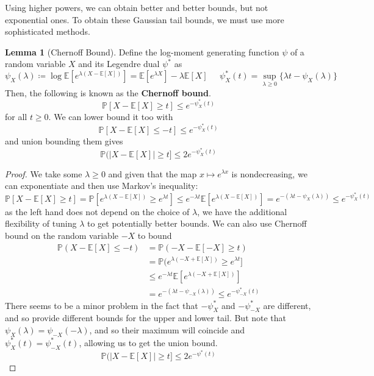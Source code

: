\documentclass{article}
\theoremstyle{definition}
\newtheorem{lemma}[theorem]{Lemma}
\theoremstyle{remark}
\theoremstyle{definition}
\begin{document}
  Using higher powers, we can obtain better and better bounds, but not exponential ones. To obtain these Gaussian tail bounds, we must use more sophisticated methods. 

  \begin{lemma}[Chernoff Bound]
  Define the log-moment generating function $\psi$ of a random variable $X$ and its Legendre dual $\psi^*$ as 
  \[\psi_X (\lambda) \coloneqq \log \mathbb{E}[ e^{\lambda (X - \mathbb{E}[X])} ] = \mathbb{E}[ e^{\lambda X} ] - \lambda \mathbb{E}[X] \;\;\;\;\; \psi_X^* (t) = \sup_{\lambda \geq 0} \{ \lambda t - \psi_X(\lambda)\}\]
  Then, the following is known as the \textbf{Chernoff bound}. 
  \[\mathbb{P}[X - \mathbb{E}[X] \geq t] \leq e^{-\psi_X^* (t)}\]
  for all $t \geq 0$. We can lower bound it too with 
  \[\mathbb{P}[X - \mathbb{E}[X] \leq -t] \leq e^{-\psi_X^* (t)}\]
  and union bounding them gives 
  \[\mathbb{P}(|X - \mathbb{E}[X] | \geq t ] \leq 2e^{- \psi_X^* (t)}\]
  \end{lemma}
  \begin{proof}
  We take some $\lambda \geq 0$ and given that the map $x \mapsto e^{\lambda x}$ is nondecreasing, we can exponentiate and then use Markov's inequality: 
  \[\mathbb{P}[X - \mathbb{E}[X] \geq t ] = \mathbb{P}[ e^{\lambda(X - \mathbb{E}[X])} \geq e^{\lambda t}] \leq e^{-\lambda t} \mathbb{E}[e^{\lambda (X - \mathbb{E}[X])}] = e^{- (\lambda t - \psi_X (\lambda))} \leq e^{-\psi_X^* (t)}\]
  as the left hand does not depend on the choice of $\lambda$, we have the additional flexibility of tuning $\lambda$ to get potentially better bounds. We can also use Chernoff bound on the random variable $-X$ to bound \begin{align*}
      \mathbb{P}(X - \mathbb{E}[X] \leq -t) & = \mathbb{P}(-X - \mathbb{E}[-X] \geq t) \\
      & = \mathbb{P}(e^{\lambda(-X + \mathbb{E}[X])} \geq e^{\lambda t} ] \\
      & \leq e^{-\lambda t} \mathbb{E}[ e^{\lambda (-X + \mathbb{E}[X])}] \\
      & = e^{-(\lambda t - \psi_{-X}(\lambda))} \leq e^{-\psi_{-X}^* (t)} 
  \end{align*}
  There seems to be a minor problem in the fact that $-\psi^*_X$ and $-\psi^*_{-X}$ are different, and so provide different bounds for the upper and lower tail. But note that $\psi_X (\lambda) = \psi_{-X}(-\lambda)$, and so their maximum will coincide and $\psi_X^* (t) = \psi_{-X}^* (t)$, allowing us to get the union bound. 
  \[\mathbb{P}(|X - \mathbb{E}[X] | \geq t ] \leq 2e^{- \psi^* (t)}\]
  \end{proof}
\end{document}
